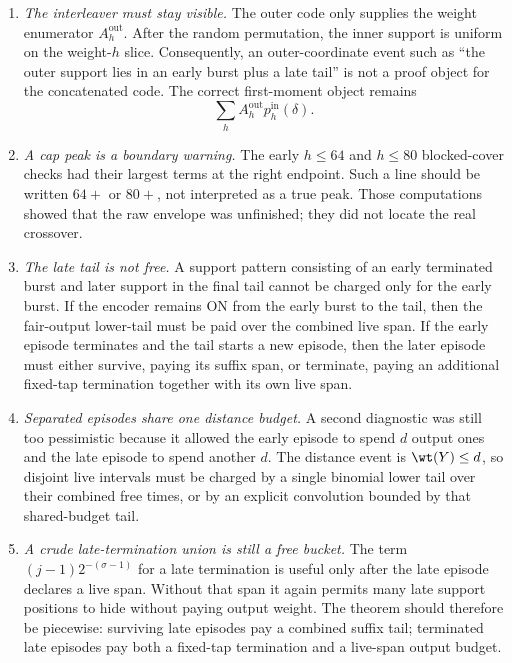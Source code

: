 \begin{enumerate}
\item \emph{The interleaver must stay visible.}  The outer code only supplies the weight enumerator
\(A_h^{\mathrm{out}}\).  After the random permutation, the inner support is uniform on the weight-\(h\) slice.
Consequently, an outer-coordinate event such as ``the outer support lies in an early burst plus a late tail'' is not a
proof object for the concatenated code.  The correct first-moment object remains
\[
\sum_h A_h^{\mathrm{out}}p_h^{\mathrm{in}}(\delta).
\]

\item \emph{A cap peak is a boundary warning.}  The early \(h\le64\) and \(h\le80\) blocked-cover checks had their
largest terms at the right endpoint.  Such a line should be written \(64+\) or \(80+\), not interpreted as a true peak.
Those computations showed that the raw envelope was unfinished; they did not locate the real crossover.

\item \emph{The late tail is not free.}  A support pattern consisting of an early terminated burst and later support in
the final tail cannot be charged only for the early burst.  If the encoder remains ON from the early burst to the tail,
then the fair-output lower-tail must be paid over the combined live span.  If the early episode terminates and the tail
starts a new episode, then the later episode must either survive, paying its suffix span, or terminate, paying an
additional fixed-tap termination together with its own live span.

\item \emph{Separated episodes share one distance budget.}  A second diagnostic was still too pessimistic because it
allowed the early episode to spend \(d\) output ones and the late episode to spend another \(d\).  The distance event is
\(\wt(Y)\le d\), so disjoint live intervals must be charged by a single binomial lower tail over their combined free
times, or by an explicit convolution bounded by that shared-budget tail.

\item \emph{A crude late-termination union is still a free bucket.}  The term
\((j-1)2^{-(\sigma-1)}\) for a late termination is useful only after the late episode declares a live span.  Without
that span it again permits many late support positions to hide without paying output weight.  The theorem should
therefore be piecewise: surviving late episodes pay a combined suffix tail; terminated late episodes pay both a
fixed-tap termination and a live-span output budget.
\end{enumerate}

